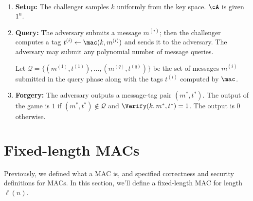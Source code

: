 \begin{definition}
$ $
   \begin{enumerate}
        \item \textbf{Setup:} The challenger samples $k$ uniformly from the key space. $\cA$ is given $1^n$.
        \item \textbf{Query:} The adversary submits a message $m^{(i)}$; then the challenger computes a tag $t^{(i)} \gets \mac(k, m^{(i)})$ and sends it to the adversary. The adversary may submit any polynomial number of message queries.
        
        Let $\mathcal{Q} = \{(m^{(1)}, t^{(1)}), \dots, (m^{(q)}, t^{(q)})\}$ be the set of messages $m^{(i)}$ submitted in the query phase along with the tags $t^{(i)}$ computed by $\mac$.
        \item \textbf{Forgery:} The adversary outputs a message-tag pair $(m^*, t^*)$. The output of the game is $1$ if $(m^*,t^*) \notin \mathcal{Q}$ and $\Verify(k, m^*, t^*) = 1$. The output is $0$ otherwise.
    \end{enumerate}
\end{definition}



 
\newcommand{\nonnegl}{\mathsf{nonnegl}}


\section{Fixed-length MACs}

Previously, we defined what a MAC is, and specified correctness and security definitions for MACs. In this section, we'll define a fixed-length MAC for length $\ell(n)$.

